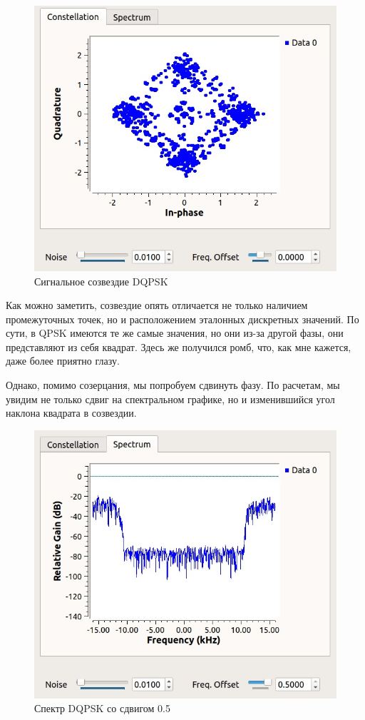 	\begin{figure}[H]
		\begin{center}
			\includegraphics[scale=0.4]{../dqpsk.jpg}
			\caption{Сигнальное созвездие DQPSK} 
		\end{center}
	\end{figure}
	Как можно заметить, созвездие опять отличается не только наличием промежуточных точек, но и расположением эталонных дискретных значений. По сути, в QPSK имеются те же самые значения, но они из-за другой фазы, они представляют из себя квадрат. Здесь же получился ромб, что, как мне кажется, даже более приятно глазу. 
	\par
	Однако, помимо созерцания, мы попробуем сдвинуть фазу. По расчетам, мы увидим не только сдвиг на спектральном графике, но и изменившийся угол наклона квадрата в созвездии.
	\begin{figure}[H]
		\begin{center}
			\includegraphics[scale=0.4]{../dqpsk_spectrum.jpg}
			\caption{Спектр DQPSK со сдвигом 0.5} 
		\end{center}
	\end{figure}
